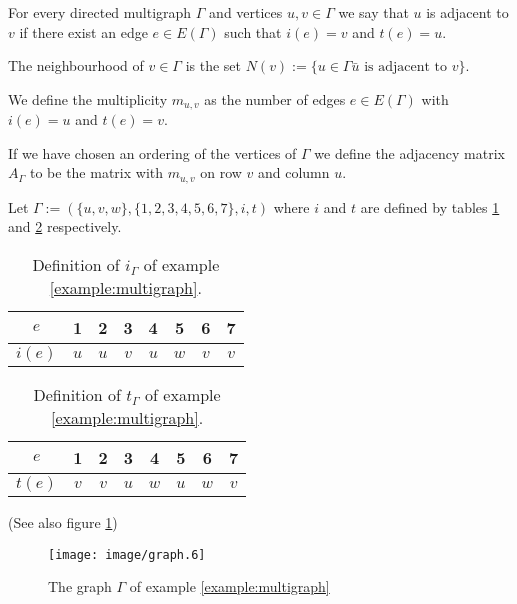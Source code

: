 \begin{definition}
	For every directed multigraph $\Gamma$ and vertices $u,v\in\Gamma$ we
	say that $u$ is adjacent to $v$ if there exist an edge $e\in E(\Gamma)$
	such that $i(e)=v$ and $t(e)=u$.
	
	The neighbourhood of $v\in\Gamma$ is the set $N(v):=\{ u\in\Gamma \bar u
	\text{ is adjacent to } v\}$.
	
	We define the multiplicity $m_{u,v}$ as the number of edges $e\in
	E(\Gamma)$ with $i(e)=u$ and $t(e)=v$.
	
	If we have chosen an ordering of the vertices of $\Gamma$ we define the
	adjacency matrix $A_{\Gamma}$ to be the matrix with $m_{u,v}$ on row $v$
	and column $u$.
\end{definition}

\begin{example}\label{example:multigraph}
	Let $\Gamma := (\{u,v,w\},\{1,2,3,4,5,6,7\},i,t)$ where $i$ and $t$ are
	defined by tables \ref{table:initial} and \ref{table:terminal}
	respectively.
	\begin{table}
		\begin{center}
			\begin{tabular}{|c|ccccccc|}
				\hline
				$e$ & 1 & 2 & 3 & 4 & 5 & 6 & 7 \\
				\hline
				$i(e)$ & $u$ & $u$ & $v$ & $u$ & $w$ & $v$ & $v$ \\
				\hline
			\end{tabular}
		\end{center}
		\caption{Definition of $i_{\Gamma}$ of example
		\ref{example:multigraph}.}\label{table:initial}
	\end{table}
	\begin{table}
		\begin{center}
			\begin{tabular}{|c|ccccccc|}
				\hline
				$e$ & 1 & 2 & 3 & 4 & 5 & 6 & 7 \\
				\hline
				$t(e)$ & $v$ & $v$ & $u$ & $w$ & $u$ & $w$ & $v$ \\
				\hline
			\end{tabular}
		\end{center}
		\caption{Definition of $t_{\Gamma}$ of example
		\ref{example:multigraph}.}\label{table:terminal}
	\end{table}
	(See also figure \ref{figure:multigraph})
	\begin{figure}
		\begin{center}
			\texttt{[image: image/graph.6]}
		\end{center}
		\caption{The graph $\Gamma$ of example
		\ref{example:multigraph}}\label{figure:multigraph} 
	\end{figure}
	

\end{example}
